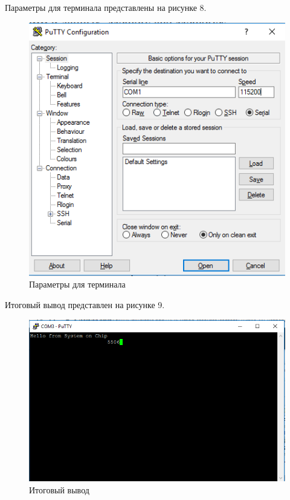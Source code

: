 Параметры для терминала представлены на рисунке 8.
\FloatBarrier
\begin{figure}[h]
	\begin{center}
		\includegraphics[width=\linewidth]{inc/command.png}
	\end{center}
	\caption{Параметры для терминала}
\end{figure}
\FloatBarrier

Итоговый вывод представлен на рисунке 9.
\FloatBarrier
\begin{figure}[h]
	\begin{center}
		\includegraphics[width=\linewidth]{inc/result.png}
	\end{center}
	\caption{Итоговый вывод}
\end{figure}
\FloatBarrier